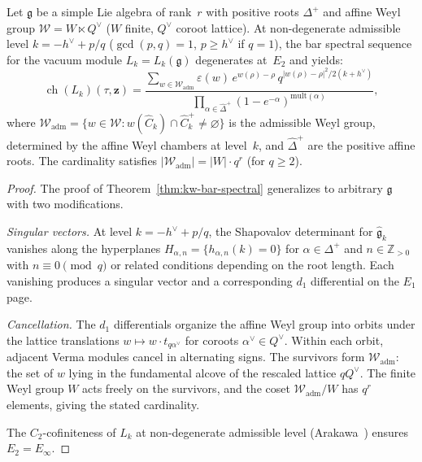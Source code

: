 \begin{theorem}
\label{thm:kw-bar-general-rank}
Let $\mathfrak{g}$ be a simple Lie algebra of rank~$r$ with
positive roots $\Delta^+$ and affine Weyl group
$\mathcal{W} = W \ltimes Q^\vee$ \textup{(}$W$ finite,
$Q^\vee$ coroot lattice\textup{)}.  At non-degenerate
admissible level $k = -h^\vee + p/q$ \textup{(}$\gcd(p,q) = 1$,
$p \geq h^\vee$ if $q = 1$\textup{)}, the bar spectral
sequence for the vacuum module
$L_k = L_k(\mathfrak{g})$ degenerates at~$E_2$ and yields\textup{:}
\begin{equation}\label{eq:kw-general}
\operatorname{ch}(L_k)(\tau, \mathbf{z})
= \frac{\sum_{w \in \mathcal{W}_{\mathrm{adm}}}
  \varepsilon(w)\, e^{w(\rho) - \rho}\,
  q^{|w(\rho) - \rho|^2 / 2(k + h^\vee)}}
{\prod_{\alpha \in \hat{\Delta}^+}
  (1 - e^{-\alpha})^{\mathrm{mult}(\alpha)}},
\end{equation}
where $\mathcal{W}_{\mathrm{adm}} = \{w \in \mathcal{W}
: w(\hat{C}_k) \cap \hat{C}_k^+ \neq \varnothing\}$ is
the admissible Weyl group, determined by the affine Weyl
chambers at level~$k$, and $\hat{\Delta}^+$ are the
positive affine roots.  The cardinality satisfies
$|\mathcal{W}_{\mathrm{adm}}| = |W| \cdot q^r$
\textup{(}for $q \geq 2$\textup{)}.
\end{theorem}

\begin{proof}
The proof of Theorem~\ref{thm:kw-bar-spectral} generalizes
to arbitrary $\mathfrak{g}$ with two modifications.

\emph{Singular vectors.}
At level $k = -h^\vee + p/q$, the Shapovalov determinant for
$\widehat{\mathfrak{g}}_k$ vanishes along the hyperplanes
$H_{\alpha,n} = \{h_{\alpha,n}(k) = 0\}$ for
$\alpha \in \Delta^+$ and $n \in \mathbb{Z}_{>0}$ with
$n \equiv 0 \pmod{q}$ or related conditions depending on
the root length.  Each vanishing produces a singular vector
and a corresponding $d_1$ differential on the $E_1$ page.

\emph{Cancellation.}
The $d_1$ differentials organize the affine Weyl group into
orbits under the lattice translations
$w \mapsto w \cdot t_{q \alpha^\vee}$ for coroots
$\alpha^\vee \in Q^\vee$.  Within each orbit, adjacent
Verma modules cancel in alternating signs.  The survivors
form $\mathcal{W}_{\mathrm{adm}}$: the set of $w$ lying in
the fundamental alcove of the rescaled lattice $qQ^\vee$.
The finite Weyl group $W$ acts freely on the survivors,
and the coset $\mathcal{W}_{\mathrm{adm}} / W$ has $q^r$
elements, giving the stated cardinality.

The $C_2$-cofiniteness of $L_k$ at non-degenerate admissible level
(Arakawa~\cite{Arakawa17}) ensures $E_2 = E_\infty$.
\end{proof}

